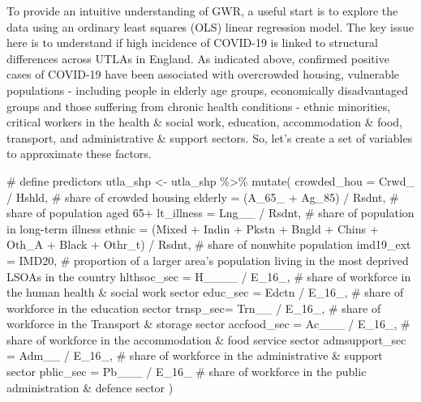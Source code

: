 \documentclass[
  letterpaper,
  krantz2]{style/krantz}
\newenvironment{Shaded}{\begin{snugshade}}{\end{snugshade}}
\newcommand{\AttributeTok}[1]{\textcolor[rgb]{0.40,0.45,0.13}{#1}}
\newcommand{\CommentTok}[1]{\textcolor[rgb]{0.37,0.37,0.37}{#1}}
\newcommand{\FunctionTok}[1]{\textcolor[rgb]{0.28,0.35,0.67}{#1}}
\newcommand{\NormalTok}[1]{\textcolor[rgb]{0.00,0.23,0.31}{#1}}
\newcommand{\OtherTok}[1]{\textcolor[rgb]{0.00,0.23,0.31}{#1}}
\newcommand{\SpecialCharTok}[1]{\textcolor[rgb]{0.37,0.37,0.37}{#1}}
\begin{document}
To provide an intuitive understanding of GWR, a useful start is to
explore the data using an ordinary least squares (OLS) linear regression
model. The key issue here is to understand if high incidence of COVID-19
is linked to structural differences across UTLAs in England. As
indicated above, confirmed positive cases of COVID-19 have been
associated with overcrowded housing, vulnerable populations - including
people in elderly age groups, economically disadvantaged groups and
those suffering from chronic health conditions - ethnic minorities,
critical workers in the health \& social work, education, accommodation
\& food, transport, and administrative \& support sectors. So, let's
create a set of variables to approximate these factors.

\begin{Shaded}
\begin{Highlighting}[]
\CommentTok{\# define predictors}
\NormalTok{utla\_shp }\OtherTok{\textless{}{-}}\NormalTok{ utla\_shp }\SpecialCharTok{\%\textgreater{}\%} \FunctionTok{mutate}\NormalTok{(}
  \AttributeTok{crowded\_hou =}\NormalTok{ Crwd\_ }\SpecialCharTok{/}\NormalTok{ Hshld, }\CommentTok{\# share of crowded housing}
  \AttributeTok{elderly =}\NormalTok{ (A\_65\_ }\SpecialCharTok{+}\NormalTok{ Ag\_85) }\SpecialCharTok{/}\NormalTok{ Rsdnt, }\CommentTok{\# share of population aged 65+}
  \AttributeTok{lt\_illness =}\NormalTok{ Lng\_\_ }\SpecialCharTok{/}\NormalTok{ Rsdnt, }\CommentTok{\# share of population in long{-}term illness}
  \AttributeTok{ethnic =}\NormalTok{ (Mixed }\SpecialCharTok{+}\NormalTok{ Indin }\SpecialCharTok{+}\NormalTok{ Pkstn }\SpecialCharTok{+}\NormalTok{ Bngld }\SpecialCharTok{+}\NormalTok{ Chins }\SpecialCharTok{+}\NormalTok{ Oth\_A }\SpecialCharTok{+}\NormalTok{ Black }\SpecialCharTok{+}\NormalTok{ Othr\_t) }\SpecialCharTok{/}\NormalTok{ Rsdnt, }\CommentTok{\# share of nonwhite population}
  \AttributeTok{imd19\_ext =}\NormalTok{ IMD20, }\CommentTok{\# proportion of a larger area’s population living in the most deprived LSOAs in the country}
  \AttributeTok{hlthsoc\_sec =}\NormalTok{ H\_\_\_\_ }\SpecialCharTok{/}\NormalTok{ E\_16\_, }\CommentTok{\# share of workforce in the human health \& social work sector}
  \AttributeTok{educ\_sec =}\NormalTok{ Edctn }\SpecialCharTok{/}\NormalTok{ E\_16\_, }\CommentTok{\# share of workforce in the education sector}
  \AttributeTok{trnsp\_sec=}\NormalTok{ Trn\_\_ }\SpecialCharTok{/}\NormalTok{ E\_16\_, }\CommentTok{\# share of workforce in the Transport \& storage sector}
  \AttributeTok{accfood\_sec =}\NormalTok{ Ac\_\_\_ }\SpecialCharTok{/}\NormalTok{ E\_16\_, }\CommentTok{\# share of workforce in the accommodation \& food service sector}
  \AttributeTok{admsupport\_sec =}\NormalTok{ Adm\_\_ }\SpecialCharTok{/}\NormalTok{  E\_16\_, }\CommentTok{\# share of workforce in the administrative \& support sector}
  \AttributeTok{pblic\_sec =}\NormalTok{ Pb\_\_\_ }\SpecialCharTok{/}\NormalTok{ E\_16\_ }\CommentTok{\# share of workforce in the public administration \& defence sector}
\NormalTok{)}
\end{Highlighting}
\end{Shaded}
\end{document}

